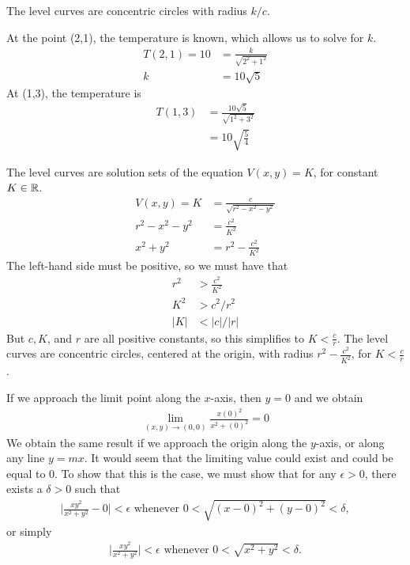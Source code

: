 The level curves are concentric circles with radius $k/c$. 
\item At the point (2,1), the temperature is known, which allows us to solve for $k$. 
\begin{align*}
  T(2,1) = 10 &= \frac{k}{\sqrt{2^2 + 1^2}}\\
  k& = 10\sqrt{5}
\end{align*} 
At (1,3), the temperature is
\begin{align*}
  T(1,3) &= \frac{10\sqrt{5}}{\sqrt{1^2 + 3^2}}\\
  & = 10\sqrt{\frac{5}{4}}
\end{align*} 
\EEN
\item The level curves are solution sets of the equation $V(x,y) = K$, for constant $K\in\mathbb{R}$.
\begin{align*}
V(x,y) = K &= \frac{c}{\sqrt{r^2 - x^2 -y^2}} \\
r^2-x^2-y^2 &= \frac{c^2}{K^2} \\
x^2+y^2 &= r^2 -  \frac{c^2}{K^2}
\end{align*}
The left-hand side must be positive, so we must have that 
\begin{align*}
r^2 &>  \frac{c^2}{K^2}\\
K^2 &> c^2/r^2\\
 |K| &<  |c|/|r|
\end{align*}
But $c, K$, and $r$ are all positive constants, so this simplifies to $K<\frac{c}{r}$. The level curves are concentric circles, centered at the origin, with radius $r^2 -  \frac{c^2}{K^2}$, for $K<\frac{c}{r}$.
\item 
If we approach the limit point along the $x$-axis, then $y=0$ and we obtain
\begin{align*}
  \lim_{(x,y)\rightarrow(0,0) } \frac{x(0)^2}{x^2+(0)^2} = 0
\end{align*}
We obtain the same result if we approach the origin along the $y$-axis, or along any line $y=mx$. It would seem that the limiting value could exist and could be equal to 0. To show that this is the case, we must show that for any $\epsilon > 0$, there exists a $\delta > 0$ such that   
\begin{align*}
 \Big|  \frac{xy^2}{x^2+y^2} - 0 \Big| < \epsilon \text{  whenever  } 0 < \sqrt{(x-0)^2 + (y-0)^2} < \delta ,
\end{align*}
or simply
\begin{align*}
 \Big|  \frac{xy^2}{x^2+y^2} \Big| < \epsilon \text{  whenever  } 0 < \sqrt{x^2 + y^2} < \delta .
\end{align*}
